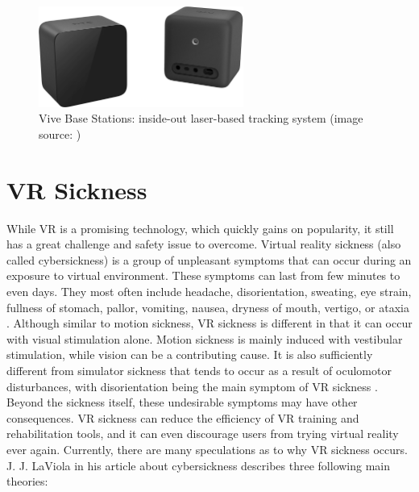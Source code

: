 \begin{figure}[th]
\centering
\includegraphics[width=0.6\textwidth]{img/base_stations.png}
\caption{Vive Base Stations: inside-out laser-based tracking system (image source: \cite{VIVE})}
\label{fig:BASE_STATIONS}
\end{figure}

\section{VR Sickness}

While VR is a promising technology, which quickly gains on popularity, it still has a great challenge and safety issue to overcome. Virtual reality sickness (also called cybersickness) is a group of unpleasant symptoms that can occur during an exposure to virtual environment. These symptoms can last from few minutes to even days. They most often include headache, disorientation, sweating, eye strain, fullness of stomach, pallor, vomiting, nausea, dryness of mouth, vertigo, or ataxia \cite{VRSYMPTOMSTIME}. Although similar to motion sickness, VR sickness is different in that it can occur with visual stimulation alone. Motion sickness is mainly induced with vestibular stimulation, while vision can be a contributing cause. It is also sufficiently different from simulator sickness that tends to occur as a result of oculomotor disturbances, with disorientation being the main symptom of VR sickness \cite{VRANDSIMULATORSICKNESS}. Beyond the sickness itself, these undesirable symptoms may have other consequences. VR sickness can reduce the efficiency of VR training and rehabilitation tools, and it can even discourage users from trying virtual reality ever again. Currently, there are many speculations as to why VR sickness occurs. J. J. LaViola in his article about cybersickness \cite{VRSYMPTOMS} describes three following main theories: 

